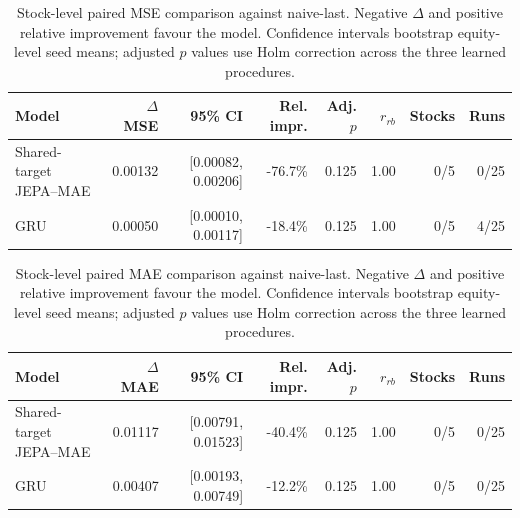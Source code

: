 \begin{table}[t]
\centering
\small
\caption{Stock-level paired MSE comparison against naive-last. Negative $\Delta$ and positive relative improvement favour the model. Confidence intervals bootstrap equity-level seed means; adjusted $p$ values use Holm correction across the three learned procedures.}
\label{tab:paired_mse_naive}
\begin{tabular}{lrrrrrrr}
\toprule
Model & $\Delta$MSE & 95\% CI & Rel. impr. & Adj. $p$ & $r_{rb}$ & Stocks & Runs \\
\midrule
Shared-target JEPA--MAE & 0.00132 & [0.00082, 0.00206] & -76.7\% & 0.125 & 1.00 & 0/5 & 0/25 \\
GRU & 0.00050 & [0.00010, 0.00117] & -18.4\% & 0.125 & 1.00 & 0/5 & 4/25 \\
\bottomrule
\end{tabular}
\end{table}

\begin{table}[t]
\centering
\small
\caption{Stock-level paired MAE comparison against naive-last. Negative $\Delta$ and positive relative improvement favour the model. Confidence intervals bootstrap equity-level seed means; adjusted $p$ values use Holm correction across the three learned procedures.}
\label{tab:paired_mae_naive}
\begin{tabular}{lrrrrrrr}
\toprule
Model & $\Delta$MAE & 95\% CI & Rel. impr. & Adj. $p$ & $r_{rb}$ & Stocks & Runs \\
\midrule
Shared-target JEPA--MAE & 0.01117 & [0.00791, 0.01523] & -40.4\% & 0.125 & 1.00 & 0/5 & 0/25 \\
GRU & 0.00407 & [0.00193, 0.00749] & -12.2\% & 0.125 & 1.00 & 0/5 & 0/25 \\
\bottomrule
\end{tabular}
\end{table}
